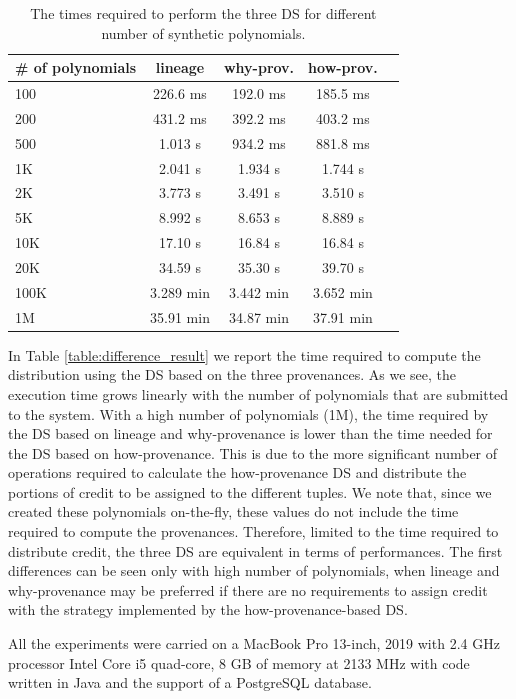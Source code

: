 \begin{table}[hbt]
\centering
  \begin{tabular}{| l |c | c | c | c ||}
  \hline
    \# of polynomials  & lineage & why-prov. & how-prov. \\
    \hline
    100 & 226.6 ms & 192.0 ms & 185.5 ms \\
    200 & 431.2 ms & 392.2 ms & 403.2 ms \\
    500 & 1.013 s  & 934.2 ms & 881.8 ms \\ 
    1K  & 2.041 s  & 1.934 s  & 1.744 s  \\
    2K  & 3.773 s  & 3.491 s  & 3.510 s  \\
    5K  & 8.992 s  & 8.653 s  & 8.889 s  \\
    10K & 17.10 s  & 16.84 s  & 16.84 s  \\
    20K & 34.59 s  & 35.30 s  & 39.70 s \\
    100K & 3.289 min & 3.442 min & 3.652 min \\
    1M  & 35.91 min & 34.87 min & 37.91 min \\
    \hline
  \end{tabular}
  \caption{The times required to perform the three DS for different number of synthetic polynomials.}
  \label{table:times}
\end{table}

In Table \ref{table:difference_result} we report the time required to compute the distribution using the DS based on the three provenances. As we see, the execution time grows linearly with the number of polynomials that are submitted to the system. With a high number of polynomials (1M), the time required by the DS based on lineage and why-provenance is lower than the time needed for the DS based on how-provenance. This is due to the more significant number of operations required to calculate the how-provenance DS  and distribute the portions of credit to be assigned to the different tuples. 
We note that, since we created these polynomials on-the-fly, these values do not include the time required to compute the provenances.
Therefore, limited to the time required to distribute credit, the three DS are equivalent in terms of performances. The first differences can be seen only with high number of polynomials, when lineage and why-provenance may be preferred if there are no requirements to assign credit with the strategy implemented by the how-provenance-based DS.

All the experiments were carried on a MacBook Pro 13-inch, 2019 with 2.4 GHz processor Intel Core i5 quad-core, 8 GB of memory at 2133 MHz with code written in Java and the support of a PostgreSQL database. 


